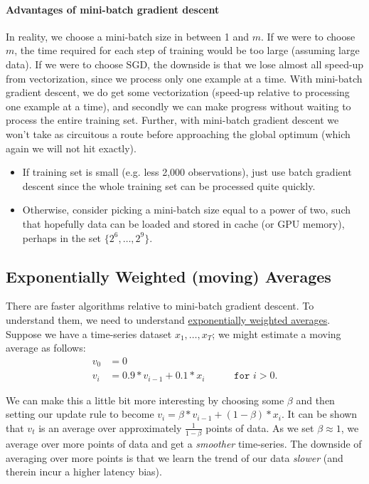 \documentclass[12pt]{article}
\begin{document}
\paragraph{Advantages of mini-batch gradient descent}
In reality, we choose a mini-batch size in between 1 and $m$. If we were to choose $m$, the time required for each step of 
training would be too large (assuming large data). If we were to choose SGD, the downside is that we lose almost all speed-up from 
vectorization, since we process only one example at a time. With mini-batch gradient descent, we do get some 
vectorization (speed-up relative to processing one example at a time), and secondly we can make progress without 
waiting to process the entire training set. Further, with mini-batch gradient descent we won't take as circuitous a 
route before approaching the global optimum (which again we will not hit exactly).

\begin{itemize}   
  \item If training set is small (e.g. less 2,000 observations), just use batch gradient descent since the whole training set can be processed quite quickly.
  \item Otherwise, consider picking a mini-batch size equal to a power of two, such that hopefully data can 
    be loaded and stored in cache (or GPU memory), perhaps in the set $\{2^6, \ldots, 2^9\}$. 
\end{itemize}

\subsection{Exponentially Weighted (moving) Averages} There are faster algorithms relative to mini-batch gradient descent.
To understand them, we need to understand \href{https://en.wikipedia.org/wiki/Moving_average#Exponential_moving_average}{exponentially weighted averages}. Suppose we have a time-series dataset  $x_1, \ldots, x_T$; we might estimate a moving average as follows:
\begin{align}
  \label{eq: expmovavg}   v_0 &= 0 \nonumber \\
  v_i &= 0.9 * v_{i-1} + 0.1 * x_i \hspace{35pt} \texttt{for } i > 0. \end{align}

We can make this a little bit more interesting by choosing some $\beta$ and then setting our update rule to become $v_i = \beta * v_{i-1} + (1-\beta) * x_i$. It can be shown that $v_t$ is an average over approximately $\frac{1}{1-\beta}$ points of data. As we set $\beta \approx 1$, we average over more points of data and get a \emph{smoother} time-series. The downside of averaging over more points is that we learn the trend of our data \emph{slower} (and therein incur a higher latency bias).
\end{document}
